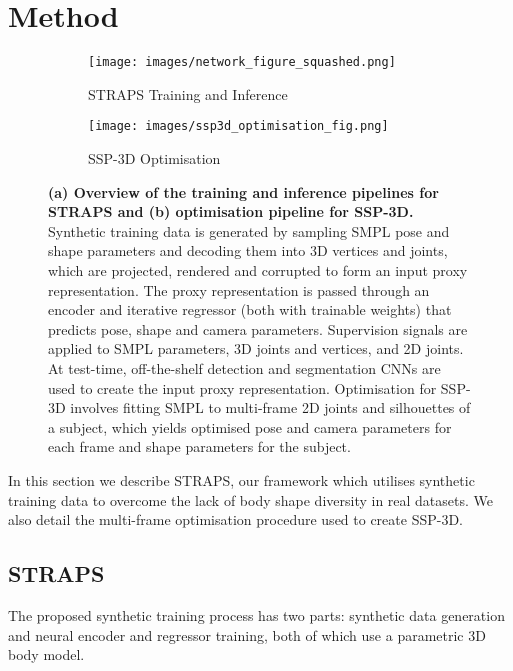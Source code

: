 \documentclass{bmvc2k}
\begin{document}
\section{Method}
\label{sec:method}

\begin{figure}[t]
     \centering
     \begin{subfigure}[b]{0.73\textwidth}
         \centering
         \texttt{[image: images/network\_figure\_squashed.png]}
         \caption{STRAPS Training and Inference}
         \label{fig:straps}
     \end{subfigure}
     \hfill
     \begin{subfigure}[b]{0.255\textwidth}
         \centering
         \texttt{[image: images/ssp3d\_optimisation\_fig.png]}
         \caption{SSP-3D Optimisation}
         \label{fig:ssp_3d}
     \end{subfigure}
    \caption{\textbf{(a) Overview of the training and inference pipelines for STRAPS and (b) optimisation pipeline for SSP-3D.} Synthetic training data is generated by sampling SMPL \citep{SMPL:2015} pose and shape parameters and decoding them into 3D vertices and joints, which are projected, rendered and corrupted to form an input proxy representation. The proxy representation is passed through an encoder and iterative regressor (both with trainable weights) that predicts pose, shape and camera parameters. Supervision signals are applied to SMPL parameters, 3D joints and vertices, and 2D joints. At test-time, off-the-shelf detection and segmentation CNNs are used to create the input proxy representation. Optimisation for SSP-3D involves fitting SMPL to multi-frame 2D joints and silhouettes of a subject, which yields optimised pose and camera parameters for each frame and shape parameters for the subject.}
    \label{fig:combined_straps_ssp3d}
\end{figure}

In this section we describe STRAPS, our framework which utilises synthetic training data to overcome the lack of body shape diversity in real datasets. We also detail the multi-frame optimisation procedure used to create SSP-3D.

\subsection{STRAPS}
The proposed synthetic training process has two parts: synthetic data generation and neural encoder and regressor training, both of which use a parametric 3D body model.
\end{document}
